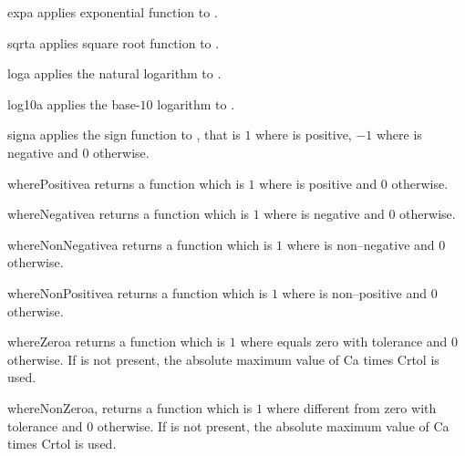 \begin{funcdesc}{exp}{a}
applies exponential function to .
\end{funcdesc}

\begin{funcdesc}{sqrt}{a}
applies square root function to .
\end{funcdesc}

\begin{funcdesc}{log}{a}
applies the natural logarithm to .
\end{funcdesc}

\begin{funcdesc}{log10}{a}
applies the base-$10$ logarithm to .
\end{funcdesc}

\begin{funcdesc}{sign}{a}
applies the sign function to , that is $1$ where  is positive,
$-1$ where  is negative and $0$ otherwise.
\end{funcdesc}

\begin{funcdesc}{wherePositive}{a}
returns a function which is $1$ where  is positive and $0$ otherwise.
\end{funcdesc}

\begin{funcdesc}{whereNegative}{a}
returns a function which is $1$ where  is negative and $0$ otherwise.
\end{funcdesc}

\begin{funcdesc}{whereNonNegative}{a}
returns a function which is $1$ where  is non--negative and $0$ otherwise.
\end{funcdesc}

\begin{funcdesc}{whereNonPositive}{a}
returns a function which is $1$ where  is non--positive and $0$ otherwise.
\end{funcdesc}

\begin{funcdesc}{whereZero}{a}
returns a function which is $1$ where  equals zero with tolerance  and $0$ otherwise. If  is not present, the absolute maximum value of C{a} times C{rtol} is used.
\end{funcdesc}

\begin{funcdesc}{whereNonZero}{a, }
returns a function which is $1$ where  different from zero with tolerance  and $0$ otherwise. If  is not present, the absolute maximum value of C{a} times C{rtol} is used.
\end{funcdesc}

